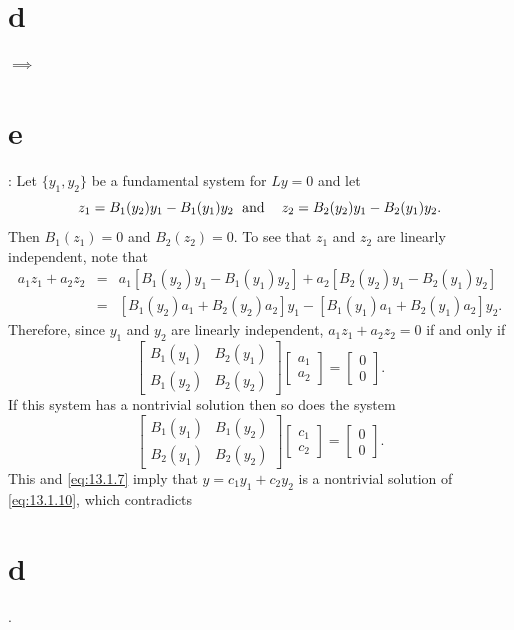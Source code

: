 \part{d} $\implies$ \part{e}: Let $\{y_{1},y_{2}\}$ be a fundamental system for $Ly=0$ and let
\[
  z_{1}=B_{1}(y_{2})y_{1}-B_{1}(y_{1})y_{2}\text{\; and\; \; }z_{2}=B_{2}(y_{2})y_{1}-B_{2}(y_{1})y_{2}.
\]
Then $B_{1}(z_{1})=0$ and $B_{2}(z_{2})=0$. To see that $z_{1}$ and $z_{2}$ are linearly
independent, note that
\begin{eqnarray*}
  a_{1}z_{1}+a_{2}z_{2} & = & a_{1}[B_{1}(y_{2})y_{1}-B_{1}(y_{1})y_{2}]+a_{2}[B_{2}(y_{2})y_{1}-B_{2}(y_{1})y_{2}] \\
                        & = & [B_{1}(y_{2})a_{1}+B_{2}(y_{2})a_{2}]y_{1}-[B_{1}(y_{1})a_{1}+B_{2}(y_{1})a_{2}]y_{2}.
\end{eqnarray*}
Therefore, since $y_{1}$ and $y_{2}$ are linearly independent, $a_{1}z_{1}+a_{2}z_{2}=0$ if and only
if
\[
  \left[
  \begin{array}{ccccccc}
    B_{1}(y_{1}) & B_{2}(y_{1}) \\
    B_{1}(y_{2}) & B_{2}(y_{2})
  \end{array}\right] \left[
  \begin{array}{ccccccc}
    a_{1} \\
    a_{2}
  \end{array}\right]= \left[
  \begin{array}{ccccccc}
    0 \\
    0
  \end{array}\right].
\]
If this system has a nontrivial solution then so does the system
\[
  \left[
  \begin{array}{ccccccc}
    B_{1}(y_{1}) & B_{1}(y_{2}) \\
    B_{2}(y_{1}) & B_{2}(y_{2})
  \end{array}\right] \left[
  \begin{array}{ccccccc}
    c_{1} \\
    c_{2}
  \end{array}\right]= \left[
  \begin{array}{ccccccc}
    0 \\
    0
  \end{array}\right].
\]
This and \eqref{eq:13.1.7} imply that $y=c_{1}y_{1}+c_{2}y_{2}$ is a nontrivial solution of
\eqref{eq:13.1.10}, which contradicts~\part{d}.

